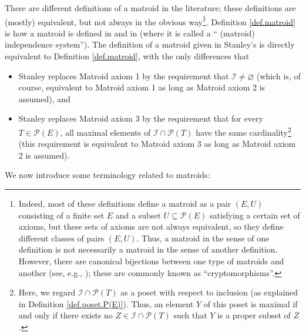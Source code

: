 \documentclass[numbers=enddot,12pt,final,onecolumn,notitlepage]{scrartcl}%
\theoremstyle{definition}
\begin{document}
There are different definitions of a matroid in the literature; these
definitions are (mostly) equivalent, but not always in the obvious
way\footnote{Indeed, most of these definitions define a matroid as a pair
$\left(  E,U\right)  $ consisting of a finite set $E$ and a subset
$U\subseteq\mathcal{P}\left(  E\right)  $ satisfying a certain set of axioms,
but these sets of axioms are not always equivalent, so they define different
classes of pairs $\left(  E,U\right)  $. Thus, a matroid in the sense of one
definition is not necessarily a matroid in the sense of another definition.
However, there are canonical bijections between one type of matroids and
another (see, e.g., \cite[\S 10.2]{Schrij13}); these are commonly known as
\textquotedblleft cryptomorphisms\textquotedblright.}. Definition
\ref{def.matroid} is how a matroid is defined in \cite[\S 10.1]{Schrij13} and
in \cite[Definition 3.4.1]{Martin22} (where it is called a \textquotedblleft%
(matroid) independence system\textquotedblright). The definition of a matroid
given in Stanley's \cite[Definition 3.8]{Stanley} is directly equivalent to
Definition \ref{def.matroid}, with the only differences that

\begin{itemize}
\item Stanley replaces Matroid axiom 1 by the requirement that $\mathcal{I}%
\neq\varnothing$ (which is, of course, equivalent to Matroid axiom 1 as long
as Matroid axiom 2 is assumed), and

\item Stanley replaces Matroid axiom 3 by the requirement that for every
$T\in\mathcal{P}\left(  E\right)  $, all maximal elements of $\mathcal{I}%
\cap\mathcal{P}\left(  T\right)  $ have the same cardinality\footnote{Here, we
regard $\mathcal{I}\cap\mathcal{P}\left(  T\right)  $ as a poset with respect
to inclusion (as explained in Definition \ref{def.poset.P(E)}). Thus, an
element $Y$ of this poset is maximal if and only if there exists no
$Z\in\mathcal{I}\cap\mathcal{P}\left(  T\right)  $ such that $Y$ is a proper
subset of $Z$.} (this requirement is equivalent to Matroid axiom 3 as long as
Matroid axiom 2 is assumed).
\end{itemize}

We now introduce some terminology related to matroids:
\end{document}
